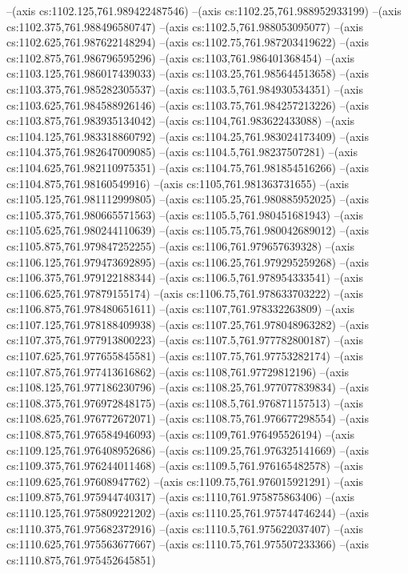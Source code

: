 --(axis cs:1102.125,761.989422487546)
--(axis cs:1102.25,761.988952933199)
--(axis cs:1102.375,761.988496580747)
--(axis cs:1102.5,761.988053095077)
--(axis cs:1102.625,761.987622148294)
--(axis cs:1102.75,761.987203419622)
--(axis cs:1102.875,761.986796595296)
--(axis cs:1103,761.986401368454)
--(axis cs:1103.125,761.986017439033)
--(axis cs:1103.25,761.985644513658)
--(axis cs:1103.375,761.985282305537)
--(axis cs:1103.5,761.984930534351)
--(axis cs:1103.625,761.984588926146)
--(axis cs:1103.75,761.984257213226)
--(axis cs:1103.875,761.983935134042)
--(axis cs:1104,761.983622433088)
--(axis cs:1104.125,761.983318860792)
--(axis cs:1104.25,761.983024173409)
--(axis cs:1104.375,761.982647009085)
--(axis cs:1104.5,761.98237507281)
--(axis cs:1104.625,761.982110975351)
--(axis cs:1104.75,761.981854516266)
--(axis cs:1104.875,761.98160549916)
--(axis cs:1105,761.981363731655)
--(axis cs:1105.125,761.981112999805)
--(axis cs:1105.25,761.980885952025)
--(axis cs:1105.375,761.980665571563)
--(axis cs:1105.5,761.980451681943)
--(axis cs:1105.625,761.980244110639)
--(axis cs:1105.75,761.980042689012)
--(axis cs:1105.875,761.979847252255)
--(axis cs:1106,761.979657639328)
--(axis cs:1106.125,761.979473692895)
--(axis cs:1106.25,761.979295259268)
--(axis cs:1106.375,761.979122188344)
--(axis cs:1106.5,761.978954333541)
--(axis cs:1106.625,761.97879155174)
--(axis cs:1106.75,761.978633703222)
--(axis cs:1106.875,761.978480651611)
--(axis cs:1107,761.978332263809)
--(axis cs:1107.125,761.978188409938)
--(axis cs:1107.25,761.978048963282)
--(axis cs:1107.375,761.977913800223)
--(axis cs:1107.5,761.977782800187)
--(axis cs:1107.625,761.977655845581)
--(axis cs:1107.75,761.97753282174)
--(axis cs:1107.875,761.977413616862)
--(axis cs:1108,761.97729812196)
--(axis cs:1108.125,761.977186230796)
--(axis cs:1108.25,761.977077839834)
--(axis cs:1108.375,761.976972848175)
--(axis cs:1108.5,761.976871157513)
--(axis cs:1108.625,761.976772672071)
--(axis cs:1108.75,761.976677298554)
--(axis cs:1108.875,761.976584946093)
--(axis cs:1109,761.976495526194)
--(axis cs:1109.125,761.976408952686)
--(axis cs:1109.25,761.976325141669)
--(axis cs:1109.375,761.976244011468)
--(axis cs:1109.5,761.976165482578)
--(axis cs:1109.625,761.97608947762)
--(axis cs:1109.75,761.976015921291)
--(axis cs:1109.875,761.975944740317)
--(axis cs:1110,761.975875863406)
--(axis cs:1110.125,761.975809221202)
--(axis cs:1110.25,761.975744746244)
--(axis cs:1110.375,761.975682372916)
--(axis cs:1110.5,761.975622037407)
--(axis cs:1110.625,761.975563677667)
--(axis cs:1110.75,761.975507233366)
--(axis cs:1110.875,761.975452645851)
